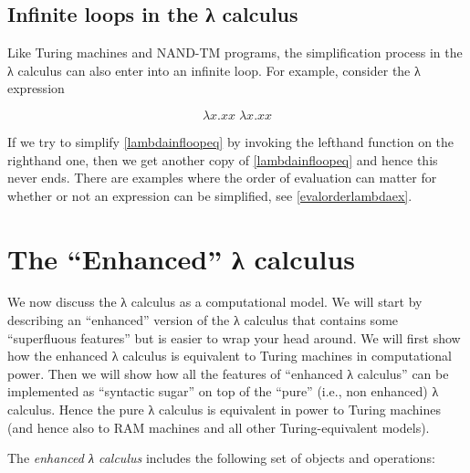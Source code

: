 
\subsection{Infinite loops in the λ calculus}\label{infiniteloopslambda}

Like Turing machines and NAND-TM programs, the simplification process in
the λ calculus can also enter into an infinite loop. For example,
consider the λ expression

\[
\lambda x.xx \; \lambda x.xx \label{lambdainfloopeq}
\]

If we try to simplify \eqref{lambdainfloopeq} by invoking the lefthand
function on the righthand one, then we get another copy of
\eqref{lambdainfloopeq} and hence this never ends. There are examples
where the order of evaluation can matter for whether or not an
expression can be simplified, see \cref{evalorderlambdaex}.

\section{The ``Enhanced'' λ calculus}\label{The-Enhanced--calculus}

We now discuss the λ calculus as a computational model. We will start by
describing an ``enhanced'' version of the λ calculus that contains some
``superfluous features'' but is easier to wrap your head around. We will
first show how the enhanced λ calculus is equivalent to Turing machines
in computational power. Then we will show how all the features of
``enhanced λ calculus'' can be implemented as ``syntactic sugar'' on top
of the ``pure'' (i.e., non enhanced) λ calculus. Hence the pure λ
calculus is equivalent in power to Turing machines (and hence also to
RAM machines and all other Turing-equivalent models).

The \emph{enhanced λ calculus} includes the following set of objects and
operations:

